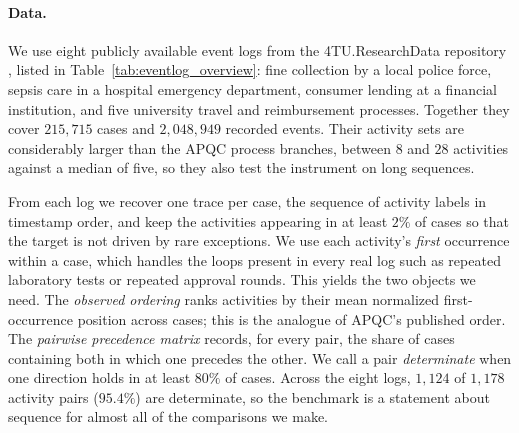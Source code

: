 \paragraph{Data.}
\label{app:eventlog_data}
We use eight publicly available event logs from the 4TU.ResearchData repository \citep{roadfines_log, sepsis_log, bpi2017_log, bpi2020_log}, listed in Table~\ref{tab:eventlog_overview}: fine collection by a local police force, sepsis care in a hospital emergency department, consumer lending at a financial institution, and five university travel and reimbursement processes.
Together they cover $215{,}715$ cases and $2{,}048{,}949$ recorded events.
Their activity sets are considerably larger than the APQC process branches, between $8$ and $28$ activities against a median of five, so they also test the instrument on long sequences.

From each log we recover one trace per case, the sequence of activity labels in timestamp order, and keep the activities appearing in at least $2\%$ of cases so that the target is not driven by rare exceptions.
We use each activity's \emph{first} occurrence within a case, which handles the loops present in every real log such as repeated laboratory tests or repeated approval rounds.
This yields the two objects we need.
The \emph{observed ordering} ranks activities by their mean normalized first-occurrence position across cases; this is the analogue of APQC's published order.
The \emph{pairwise precedence matrix} records, for every pair, the share of cases containing both in which one precedes the other.
We call a pair \emph{determinate} when one direction holds in at least $80\%$ of cases.
Across the eight logs, $1{,}124$ of $1{,}178$ activity pairs ($95.4\%$) are determinate, so the benchmark is a statement about sequence for almost all of the comparisons we make.

